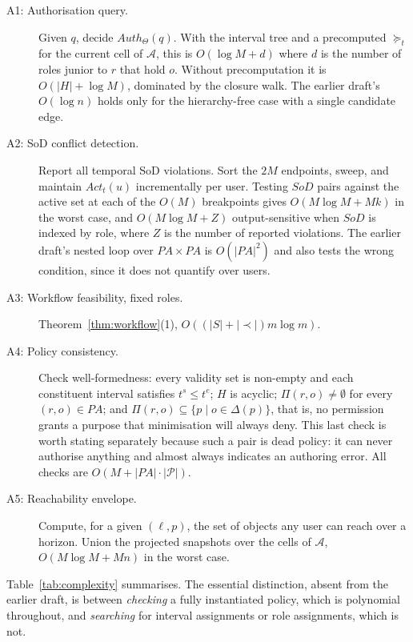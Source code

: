 \documentclass[11pt]{article}
\theoremstyle{definition}
\theoremstyle{plain}
\theoremstyle{remark}
\newcommand{\Auth}{\mathit{Auth}}
\newcommand{\Act}{\mathit{Act}}
\newcommand{\SoD}{\mathit{SoD}}
\newcommand{\Pdom}{\mathcal{P}}
\begin{document}
\begin{description}
  \item[A1: Authorisation query.] Given $q$, decide $\Auth_\Theta(q)$. With the
        interval tree and a precomputed $\succeq_t$ for the current cell of
        $\mathcal{A}$, this is $O(\log M + d)$ where $d$ is the number of roles
        junior to $r$ that hold $o$. Without precomputation it is
        $O(|H| + \log M)$, dominated by the closure walk. The earlier draft's
        $O(\log n)$ holds only for the hierarchy-free case with a single
        candidate edge.
  \item[A2: SoD conflict detection.] Report all temporal SoD violations. Sort
        the $2M$ endpoints, sweep, and maintain $\Act_t(u)$ incrementally per
        user. Testing $\SoD$ pairs against the active set at each of the $O(M)$
        breakpoints gives $O(M \log M + Mk)$ in the worst case, and
        $O(M \log M + Z)$ output-sensitive when $\SoD$ is indexed by role, where
        $Z$ is the number of reported violations. The earlier draft's nested
        loop over $PA \times PA$ is $O(|PA|^2)$ and also tests the wrong
        condition, since it does not quantify over users.
  \item[A3: Workflow feasibility, fixed roles.] Theorem~\ref{thm:workflow}(1),
        $O((|S| + |{\prec}|) m \log m)$.
  \item[A4: Policy consistency.] Check well-formedness: every validity set is
        non-empty and each constituent interval satisfies $t^s \le t^e$; $H$ is
        acyclic; $\Pi(r,o) \neq \emptyset$ for every $(r,o) \in PA$; and
        $\Pi(r,o) \subseteq \{p \mid o \in \Delta(p)\}$, that is, no permission
        grants a purpose that minimisation will always deny. This last check is
        worth stating separately because such a pair is dead policy: it can
        never authorise anything and almost always indicates an authoring error.
        All checks are $O(M + |PA| \cdot |\Pdom|)$.
  \item[A5: Reachability envelope.] Compute, for a given $(\ell,p)$, the set of
        objects any user can reach over a horizon. Union the projected snapshots
        over the cells of $\mathcal{A}$, $O(M \log M + M n)$ in the worst case.
\end{description}

Table~\ref{tab:complexity} summarises. The essential distinction, absent from
the earlier draft, is between \emph{checking} a fully instantiated policy, which
is polynomial throughout, and \emph{searching} for interval assignments or role
assignments, which is not.
\end{document}
